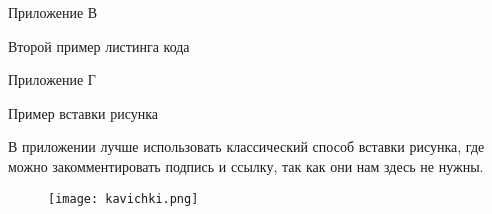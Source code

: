 \documentclass{report}
\begin{document}
\begin{flushright}
     Приложение В
\end{flushright}

\begin{center}  Второй пример листинга кода \end{center}




\newpage


\begin{flushright}
     Приложение Г
\end{flushright}

\begin{center}  Пример вставки рисунка \end{center}

В приложении лучше использовать классический способ вставки рисунка, где можно закомментировать подпись и ссылку, так как они нам здесь не нужны.

\begin{figure}[H]
\centering
    \texttt{[image: kavichki.png]}
    \captionsetup{justification=centering, format=plain}
\end{figure}
\end{document}
